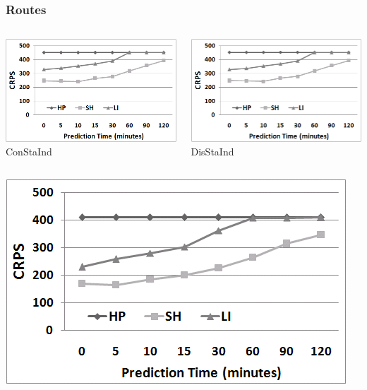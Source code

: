 \documentclass[t]{beamer}
\begin{document}
\begin{frame}\frametitle{Routes}
\vspace{-0.35in}
\begin{columns}
		\begin{center}
			\includegraphics[scale=0.3]{Approaches_ConStaInd.png}\\
			ConStaInd
		\end{center}
		\begin{center}
			\includegraphics[scale=0.3]{Approaches_DisStaInd.png}\\
			DisStaInd
		\end{center}
\end{columns}
\begin{columns}
		\begin{center}
			\includegraphics[scale=0.3]{Approaches_DisTimInd.png}\\

\end{center}
\end{columns}
\end{frame}
\end{document}
